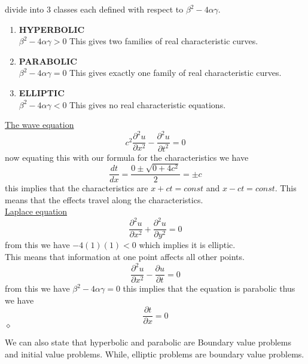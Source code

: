divide into 3 classes each defined with respect to $\beta^2-4\alpha\gamma$.
\begin{enumerate}
\item
\textbf{HYPERBOLIC}\\
$\beta^2-4\alpha\gamma>0$
This gives two families of real characteristic curves.
\item
\textbf{PARABOLIC}\\
$\beta^2-4\alpha\gamma=0$
This gives exactly one family of real characteristic curves.
\item
\textbf{ELLIPTIC}\\
$\beta^2-4\alpha\gamma<0$
This gives no real characteristic equations.
\end{enumerate}
\begin{example}
\underline{The wave equation}
\[c^2\frac{\partial^2u}{\partial x^2}-\frac{\partial^2u}{\partial t^2}=0\]
now equating this with our formula for the characteristics we have
\[\frac{dt}{dx}=\frac{0\pm\sqrt{0+4c^2}}{2}=\pm c\]
this implies that the characteristics are $x+ct=const$ and $x-ct=const$.
This means that the effects travel along the characteristics.\\
\underline{Laplace equation}
\[\frac{\partial^2 u}{\partial x^2} + \frac{\partial^2u}{\partial y^2} =0\]
from this we have $-4(1)(1)< 0$ which implies it is elliptic.\\
This means that information at one point affects all other points.\\
\underline{}
\[\frac{\partial^2u}{\partial x^2}-\frac{\partial u}{\partial t}=0\]
from this we have $\beta^2-4\alpha\gamma=0$ this implies that the equation is
parabolic thus we have
\[ \frac{\partial t}{\partial x}=0\]
$\diamond$\\
\end{example} 
We can also state that hyperbolic and parabolic are Boundary value problems
and initial value problems.  While, elliptic problems are boundary value problems.
